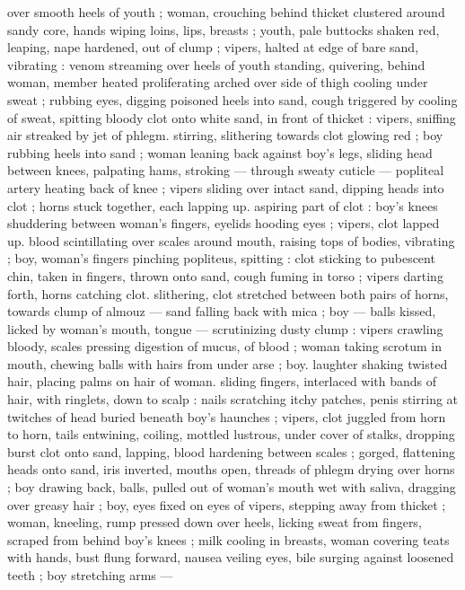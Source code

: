 over smooth heels of youth ; woman, crouching behind thicket 
clustered around sandy core, hands wiping loins, lips, breasts ; 
youth, pale buttocks shaken red, leaping, nape hardened, out of 
clump ; vipers, halted at edge of bare sand, vibrating : venom 
streaming over heels of youth standing, quivering, behind woman, 
member heated proliferating arched over side of thigh cooling under 
sweat ; rubbing eyes, digging poisoned heels into sand, cough 
triggered by cooling of sweat, spitting bloody clot onto white sand, 
in front of thicket : vipers, sniffing air streaked by jet of phlegm. 
stirring, slithering towards clot glowing red ; boy rubbing heels into 
sand ; woman leaning back against boy's legs, sliding head between 
knees, palpating hams, stroking --- through sweaty cuticle --- 
popliteal artery heating back of knee ; vipers sliding over intact 
sand, dipping heads into clot ; horns stuck together, each lapping up. 
aspiring part of clot : boy's knees shuddering between woman's 
fingers, eyelids hooding eyes ; vipers, clot lapped up. blood 
scintillating over scales around mouth, raising tops of bodies, 
vibrating ; boy, woman's fingers pinching popliteus, spitting : clot 
sticking to pubescent chin, taken in fingers, thrown onto sand, cough 
fuming in torso ; vipers darting forth, horns catching clot. slithering, 
clot stretched between both pairs of horns, towards clump of almouz 
--- sand falling back with mica ; boy --- balls kissed, licked by 
woman's mouth, tongue --- scrutinizing dusty clump : vipers crawling 
bloody, scales pressing digestion of mucus, of blood ; woman taking 
scrotum in mouth, chewing balls with hairs from under arse ; boy. 
laughter shaking twisted hair, placing palms on hair of woman. sliding 
fingers, interlaced with bands of hair, with ringlets, down to scalp : 
nails scratching itchy patches, penis stirring at twitches of head 
buried beneath boy's haunches ; vipers, clot juggled from horn to 
horn, tails entwining, coiling, mottled lustrous, under cover of stalks, 
dropping burst clot onto sand, lapping, blood hardening between 
scales ; gorged, flattening heads onto sand, iris inverted, mouths 
open, threads of phlegm drying over horns ; boy drawing back, balls, 
pulled out of woman's mouth wet with saliva, dragging over greasy 
hair ; boy, eyes fixed on eyes of vipers, stepping away from thicket ; 
woman, kneeling, rump pressed down over heels, licking sweat from 
fingers, scraped from behind boy's knees ; milk cooling in breasts, 
woman covering teats with hands, bust flung forward, nausea veiling 
eyes, bile surging against loosened teeth ; boy stretching arms --- 
